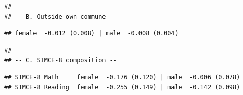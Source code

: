\documentclass[
]{article}
\begin{document}
\begin{verbatim}
## 
## -- B. Outside own commune --
\end{verbatim}

\begin{verbatim}
## female  -0.012 (0.008) | male  -0.008 (0.004)
\end{verbatim}

\begin{verbatim}
## 
## -- C. SIMCE-8 composition --
\end{verbatim}

\begin{verbatim}
## SIMCE-8 Math     female  -0.176 (0.120) | male  -0.006 (0.078)
## SIMCE-8 Reading  female  -0.255 (0.149) | male  -0.142 (0.098)
\end{verbatim}
\end{document}
